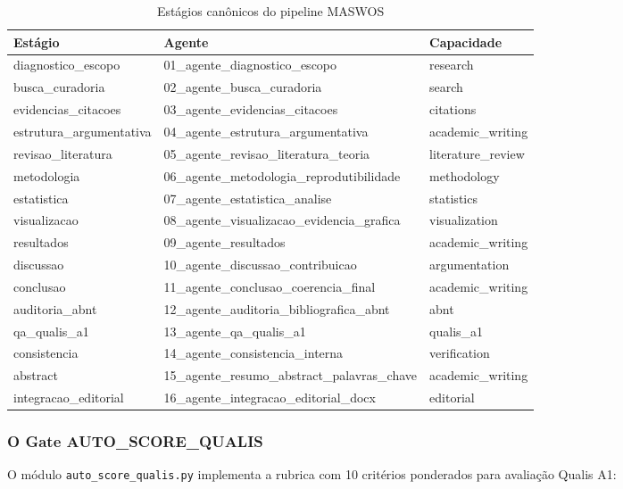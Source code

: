 \begin{table}[H]
\centering
\caption{Estágios canônicos do pipeline MASWOS}
\label{tab:maswos-stages}
\begin{tabular}{@{}lll@{}}
\toprule
\textbf{Estágio} & \textbf{Agente} & \textbf{Capacidade} \\
\midrule
diagnostico\_escopo & 01\_agente\_diagnostico\_escopo & research \\
busca\_curadoria & 02\_agente\_busca\_curadoria & search \\
evidencias\_citacoes & 03\_agente\_evidencias\_citacoes & citations \\
estrutura\_argumentativa & 04\_agente\_estrutura\_argumentativa & academic\_writing \\
revisao\_literatura & 05\_agente\_revisao\_literatura\_teoria & literature\_review \\
metodologia & 06\_agente\_metodologia\_reprodutibilidade & methodology \\
estatistica & 07\_agente\_estatistica\_analise & statistics \\
visualizacao & 08\_agente\_visualizacao\_evidencia\_grafica & visualization \\
resultados & 09\_agente\_resultados & academic\_writing \\
discussao & 10\_agente\_discussao\_contribuicao & argumentation \\
conclusao & 11\_agente\_conclusao\_coerencia\_final & academic\_writing \\
auditoria\_abnt & 12\_agente\_auditoria\_bibliografica\_abnt & abnt \\
qa\_qualis\_a1 & 13\_agente\_qa\_qualis\_a1 & qualis\_a1 \\
consistencia & 14\_agente\_consistencia\_interna & verification \\
abstract & 15\_agente\_resumo\_abstract\_palavras\_chave & academic\_writing \\
integracao\_editorial & 16\_agente\_integracao\_editorial\_docx & editorial \\
\bottomrule
\end{tabular}
\end{table}

\subsubsection{O Gate AUTO\_SCORE\_QUALIS}

O módulo \texttt{auto\_score\_qualis.py} implementa a rubrica com 10 critérios ponderados para avaliação Qualis A1:

